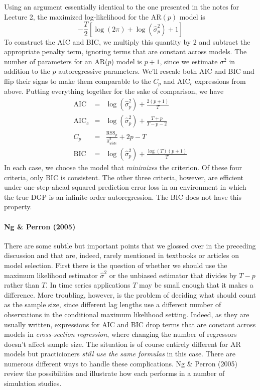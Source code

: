 \documentclass[12pt]{article}
\theoremstyle{definition}
\begin{document}
Using an argument essentially identical to the one presented in the notes for Lecture 2, the maximized log-likelihood for the AR$(p)$ model is
	$$-\frac{T}{2}\left[\log(2\pi) + \log\left(\widehat{\sigma}^2_p \right) + 1\right]$$
To construct the AIC and BIC, we multiply this quantity by 2 and subtract the appropriate penalty term, ignoring terms that are constant across models. The number of parameters for an AR($p$) model is $p+1$, since we estimate $\sigma^2$ in addition to the $p$ autoregressive parameters. We'll rescale both AIC and BIC and flip their signs to make them comparable to the $C_p$ and AIC$_c$ expressions from above. Putting everything together for the sake of comparison, we have
\begin{eqnarray*}
	\mbox{AIC} &=& \log\left(\widehat{\sigma}^2_p \right) + \frac{2(p+1)}{T}\\
	\mbox{AIC}_c &=&  \log\left(\widehat{\sigma}^2_p \right) + \frac{T+p}{T-p-2}\\
	C_p &=&  \frac{\mbox{RSS}_p}{\widehat{\sigma}^2_{wide}} + 2p- T\\
	\mbox{BIC} &=&\log\left(\widehat{\sigma}^2_p \right) + \frac{ \log(T)(p+1)}{T}
\end{eqnarray*}
In each case, we choose the model that \emph{minimizes} the criterion. Of these four criteria, only BIC is consistent. The other three criteria, however, are efficient under one-step-ahead squared prediction error loss in an environment in which the true DGP is an infinite-order autoregression. The BIC does not have this property.


\paragraph{Ng \& Perron (2005)} There are some subtle but important points that we glossed over in the preceding discussion and that are, indeed, rarely mentioned in textbooks or articles on model selection. First there is the question of whether we should use the maximum likelihood estimator $\widehat{\sigma}^2$ or the unbiased estimator that divides by $T-p$ rather than $T$. In time series applications $T$ may be small enough that it makes a difference. More troubling, however, is the problem of deciding what should count as the sample size, since different lag lengths use a different number of observations in the conditional maximum likelihood setting. Indeed, as they are usually written, expressions for AIC and BIC drop terms that are constant across models in \emph{cross-section regression}, where changing the number of regressors doesn't affect sample size. The situation is of course entirely different for AR models but practicioners \emph{still use the same formulas} in this case. There are numerous different ways to handle these complications. Ng \& Perron (2005) review the possibilities and illustrate how each performs in a number of simulation studies.
\end{document}
